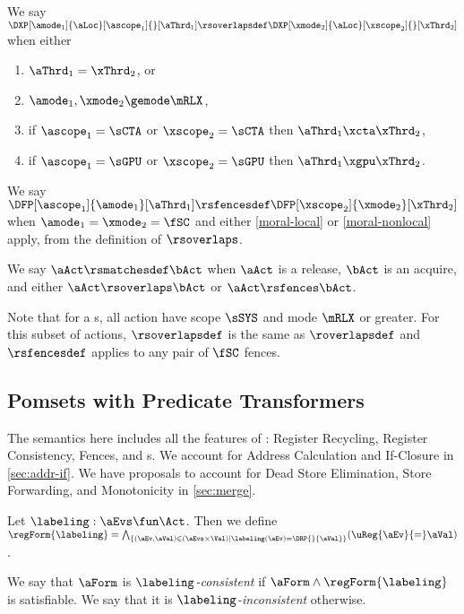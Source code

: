 \begin{definition}  
  We say
  $\DXP[\amode_1]{\aLoc}[\ascope_1]{}[\aThrd_1] \rsoverlapsdef
  \DXP[\xmode_2]{\aLoc}[\xscope_2]{}[\xThrd_2]$ when %
  either
  \begin{multicols}{2}
    \begin{enumerate}[,label=(2\alph*),ref=2\alph*]      
    \item[{\labeltext[1]{(1)}{moral-local}}]
    $\aThrd_1=\xThrd_2$, or
    \item $\amode_1,\xmode_2\gemode\mRLX$,
    \item if $\ascope_1=\sCTA$ or $\xscope_2=\sCTA$ then $\aThrd_1\xcta\xThrd_2$, %
    \item if $\ascope_1=\sGPU$ or $\xscope_2=\sGPU$ then $\aThrd_1\xgpu\xThrd_2$.
    \end{enumerate}
  \end{multicols}
  \smallskip

  We say
  $\DFP[\ascope_1]{\amode_1}[\aThrd_1] \rsfencesdef \DFP[\xscope_2]{\xmode_2}[\xThrd_2]$
  when $\amode_1=\xmode_2=\fSC$ and either \eqref{moral-local} or
  \eqref{moral-nonlocal} apply, from the definition of $\rsoverlaps$.

  We say $\aAct \rsmatchesdef \bAct$ when $\aAct$ is a release, $\bAct$ is an
  acquire, and either $\aAct\rsoverlaps \bAct$ or $\aAct\rsfences
  \bAct$. 

\end{definition}

Note that for a \CPU{}s, all action have scope $\sSYS$ and mode $\mRLX$ or
greater.  For this subset of actions, $\rsoverlapsdef$ is the same as
$\roverlapsdef$ and $\rsfencesdef$ applies to any pair of $\fSC$ fences.






\subsection{Pomsets with Predicate Transformers}
\label{sec:pomsets}

The semantics here includes all the features of \cite[]{PwT}:
Register Recycling, Register Consistency, Fences, and \RMW{}s.  We
account for Address Calculation and If-Closure in \textsection\ref{sec:addr-if}.
We have proposals to account for Dead Store Elimination, Store Forwarding,
and Monotonicity in \textsection\ref{sec:merge}.
\begin{definition}  
  \label{def:labeling:consistent}
  Let $\labeling: \aEvs \fun \Act$.
  Then we define
  \begin{math}
    \regForm{\labeling}=
    \textstyle\bigwedge_{\{(\aEv,\aVal)\in(\aEvs\times\Val)\mid\labeling(\aEv)=\DRP{}{\aVal}\}}(\uReg{\aEv}{=}\aVal)
  \end{math}.
  
  We say that $\aForm$ is \emph{$\labeling$-consistent} if $\aForm\land\regForm{\labeling}$ is satisfiable.
  We say that it is \emph{$\labeling$-inconsistent} otherwise.
\end{definition}

